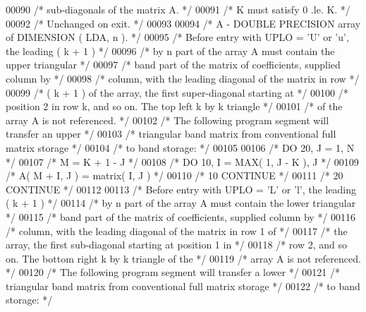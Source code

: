 \begin{DoxyCode}
00090 \textcolor{comment}{/*           sub-diagonals of the matrix A. */}
00091 \textcolor{comment}{/*           K must satisfy  0 .le. K. */}
00092 \textcolor{comment}{/*           Unchanged on exit. */}
00093 
00094 \textcolor{comment}{/*  A      - DOUBLE PRECISION array of DIMENSION ( LDA, n ). */}
00095 \textcolor{comment}{/*           Before entry with UPLO = 'U' or 'u', the leading ( k + 1 ) */}
00096 \textcolor{comment}{/*           by n part of the array A must contain the upper triangular */}
00097 \textcolor{comment}{/*           band part of the matrix of coefficients, supplied column by */}
00098 \textcolor{comment}{/*           column, with the leading diagonal of the matrix in row */}
00099 \textcolor{comment}{/*           ( k + 1 ) of the array, the first super-diagonal starting at */}
00100 \textcolor{comment}{/*           position 2 in row k, and so on. The top left k by k triangle */}
00101 \textcolor{comment}{/*           of the array A is not referenced. */}
00102 \textcolor{comment}{/*           The following program segment will transfer an upper */}
00103 \textcolor{comment}{/*           triangular band matrix from conventional full matrix storage */}
00104 \textcolor{comment}{/*           to band storage: */}
00105 
00106 \textcolor{comment}{/*                 DO 20, J = 1, N */}
00107 \textcolor{comment}{/*                    M = K + 1 - J */}
00108 \textcolor{comment}{/*                    DO 10, I = MAX( 1, J - K ), J */}
00109 \textcolor{comment}{/*                       A( M + I, J ) = matrix( I, J ) */}
00110 \textcolor{comment}{/*              10    CONTINUE */}
00111 \textcolor{comment}{/*              20 CONTINUE */}
00112 
00113 \textcolor{comment}{/*           Before entry with UPLO = 'L' or 'l', the leading ( k + 1 ) */}
00114 \textcolor{comment}{/*           by n part of the array A must contain the lower triangular */}
00115 \textcolor{comment}{/*           band part of the matrix of coefficients, supplied column by */}
00116 \textcolor{comment}{/*           column, with the leading diagonal of the matrix in row 1 of */}
00117 \textcolor{comment}{/*           the array, the first sub-diagonal starting at position 1 in */}
00118 \textcolor{comment}{/*           row 2, and so on. The bottom right k by k triangle of the */}
00119 \textcolor{comment}{/*           array A is not referenced. */}
00120 \textcolor{comment}{/*           The following program segment will transfer a lower */}
00121 \textcolor{comment}{/*           triangular band matrix from conventional full matrix storage */}
00122 \textcolor{comment}{/*           to band storage: */}

\end{DoxyCode}
